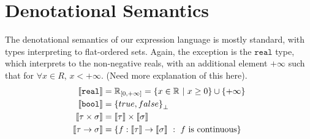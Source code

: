 \section{Denotational Semantics}
The denotational semantics of our expression language is mostly standard, with types interpreting to flat-ordered sets. Again, 
the exception is the $\texttt{real}$ type, which interprets to the non-negative reals, with an additional element $+\infty$ such 
that for $\forall x \in R$, $x<+\infty$. (Need more explanation of this here).
 \begin{align*}
\llbracket \texttt{real} \rrbracket &= \mathbb{R}_{[0, +\infty]} = \{x \in \mathbb{R} \ | \ x \geq 0\} \cup \{+\infty\} \\
 \llbracket \texttt{bool} \rrbracket &= {\{true, false\}}_{\perp} \\
 \llbracket \tau \times \sigma \rrbracket &= \llbracket \tau \rrbracket \times \llbracket \sigma \rrbracket  \\
 \llbracket \tau \rightarrow \sigma \rrbracket &= \{f: \llbracket \tau \rrbracket \rightarrow \llbracket \sigma \rrbracket \ : 
 \ f \text{ is continuous}\}
 \end{align*}
